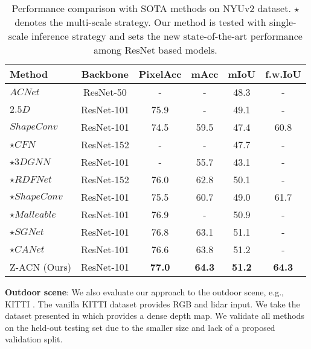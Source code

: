 \documentclass[lettersize,journal]{IEEEtran}
\begin{document}
\begin{table}[t]
\caption{Performance comparison with SOTA methods on NYUv2 dataset. $\star$ denotes the multi-scale strategy. Our method is tested with single-scale inference strategy and sets the new state-of-the-art performance among ResNet based models.}
\label{tab:nyu}
\centering
\setlength\tabcolsep{1pt}
\setlength\extrarowheight{0pt}
\begin{tabular}[ht]{l c c c c c }
\hline

\hline

\hline

\hline
 Method  & Backbone & PixelAcc & mAcc & mIoU & f.w.IoU \\
\hline
$ACNet$ \cite{hu2019acnet}  &ResNet-50 & - & - & 48.3 & - \\
$2.5D$ \cite{xing20192}  &ResNet-101& 75.9 & - & 49.1 & - \\
$ShapeConv$ \cite{cao2021shapeconv} &ResNet-101 & 74.5 & 59.5 & 47.4 & 60.8 \\
\hline

\hline

\hline


$\star CFN$ \cite{Lin2017RGBDCascaded}  &ResNet-152 & - & - & 47.7 & - \\
$\star 3DGNN$ \cite{qi20173d} &ResNet-101 & - & 55.7 & 43.1 & - \\
$\star RDFNet$ \cite{park2017rdfnet} &ResNet-152 & 76.0 & 62.8 & 50.1 & - \\
$\star ShapeConv$ \cite{cao2021shapeconv} &ResNet-101 & 75.5 & 60.7 & 49.0 & 61.7 \\
$\star Malleable$ \cite{xing2020malleable}  &ResNet-101 & 76.9 & - & 50.9 & - \\
$\star SGNet$ \cite{chen2021spatial}  &ResNet-101 & 76.8 & 63.1 & 51.1 & - \\
$\star CANet$ \cite{zhou2020canet} &ResNet-101 & 76.6 & 63.8 & 51.2 & - \\
\hline

\hline

\hline
Z-ACN (Ours)  &ResNet-101 & \textbf{77.0} & \textbf{64.3} & \textbf{51.2} & \textbf{64.3} \\
\hline

\hline

\hline

\hline
\end{tabular}
\end{table}




\textbf{Outdoor scene}:
\label{outdoor}
We also evaluate our approach to the outdoor scene, e.g., KITTI \cite{kitti}. The vanilla KITTI dataset provides RGB and lidar input. We take the dataset presented in \cite{xu:kitti} which provides a dense depth map. We validate all methods on the held-out testing set due to the smaller size and lack of a proposed validation split.
\end{document}
